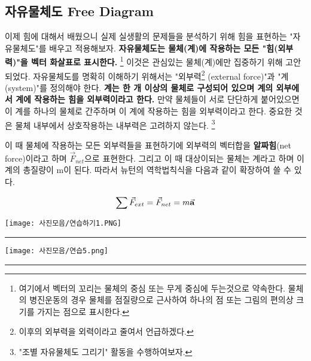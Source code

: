 \subsection{자유물체도 Free Diagram}
이제 힘에 대해서 배웠으니 실제 실생활의 문제들을 분석하기 위해 힘을 표현하는 "자유물체도"를 배우고 적용해보자. 
\textbf{자유물체도는 물체(계)에 작용하는 모든 "힘(외부력)"을 벡터 화살표로 표시한다.} \footnote{여기에서
벡터의 꼬리는 물체의 중심 또는 무게 중심에 두는것으로 약속한다. 물체의 병진운동의 경우 물체를 점질량으로 근사하여 하나의 점 또는 
그림의 편의상 크기를 가지는 점으로 표시한다.}
이것은 관심있는 물체(계)에만 집중하기 위해 고안되었다. 자유물체도를 명확히 이해하기 위해서는 "외부력\footnote{이후의 외부력을 
외력이라고 줄여서 언급하겠다.} (external force)"과 "계 (system)"를 정의해야 한다. 
\textbf{계는 한 개 이상의 물체로 구성되어 있으며 계의 외부에서 계에 작용하는 힘을 외부력이라고 한다.} 
만약 물체들이 서로 단단하게 붙어있으면 이 계를 하나의 물체로 간주하며 이 계에 작용하는 힘을 외부력이라고 한다. 
중요한 것은 물체 내부에서 상호작용하는 내부력은 고려하지 않는다. \footnote{"조별 자유물체도 그리기" 활동을 수행하여보자.}

이 때 물체에 작용하는 모든 외부력들을 표현하기에 외부력의 벡터합을 \textbf{알짜힘}(net force)이라고 하며 
$\vec{F}_{net}$으로 표현한다. 그리고 이 때 대상이되는 물체는 계라고 하며 이 계의 총질량이 m이 된다.
따라서 뉴턴의 역학법칙식을 다음과 같이 확장하여 쓸 수 있다.          

    \begin{defn}
    \begin{equation}\label{eq:newton's law 2}
      \sum\vec{F}_{ext}=\vec{F}_{net}=m\va{a} 
    \end{equation}
  \end{defn}

  \clearpage
  \begin{task}[줄의 장력, 수직항력]
 \begin{flushleft}
  {
  {\texttt{[image: 사진모음/연습하기1.PNG]}
 \label{fig:연습1}}%
  {\rule{\linewidth}{4cm}}}
 \end{flushleft}
\end{task}

\begin{task}
  \begin{flushleft}
    {
    {\texttt{[image: 사진모음/연습5.png]}
  \label{fig:물체 위의 물체}}%
    {\rule{\linewidth}{4cm}}}
   \end{flushleft}
\end{task}
